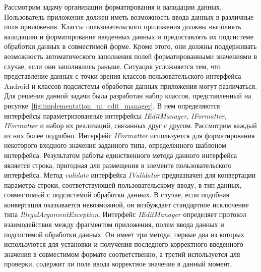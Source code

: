 Рассмотрим задачу организации форматирования и валидации данных.
Пользователь приложения должен иметь возможность ввода данных в
различные поля приложения.
Классы пользовательского приложения должны выполнять валидацию и форматирование
введенных данных и предоставлять их подсистеме обработки данных в совместимой форме.
Кроме этого, они должны поддерживать возможность автоматического
заполнения полей форматированными значениями в случае, если они заполнялись раньше.
Ситуация усложняется тем, что представление данных с точки зрения классов
пользовательского интерфейса Android и классов подсистемы обработки данных
приложения могут различаться.
Для решения данной задачи была разработан набор классов, представленный
на рисунке~\ref{fig:implementation_ui_edit_manager}.
В нем определяются интерфейсы параметризованные интерфейсы
\textit{IEditManager}, \textit{IFormatter}, \textit{IFormatter}
и набор их реализаций, связанных друг с другом. Рассмотрим каждый из них более подробно.
Интерфейс \textit{IFormatter} используется для форматирования некоторого входного
значения заданного типа, определенного шаблоном интерфейса.
Результатом работы единственного метода данного интерфейса является строка,
пригодная для размещения в элементе пользовательского интерфейса.
Метод \textit{validate} интерфейса \textit{IValidator} предназначен для
конвертации параметра-строки, соответствующей пользовательскому вводу,
в тип данных, совместимый с подсистемой обработки данных. В случае,
если подобная конвертация оказывается невозможной, он возбуждает
стандартное исключение типа \textit{IllegalArgumentException}.
Интерфейс \textit{IEditManager} определяет протокол взаимодействия
между фрагментом приложения, полем ввода данных
и подсистемой обработки данных.
Он имеет три метода, первые два из которых используются
для установки и получения последнего корректного введенного значения
в совместимом формате соответственно, а третий используется для проверки,
содержит ли поле ввода корректное значение в данный момент.

